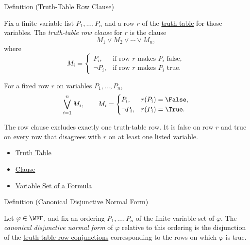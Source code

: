 \begin{definitionbox}{Definition (Truth-Table Row Clause)}
\begin{definition}
\label{def:truth-table-row-clause-propositional-logic}
Fix a finite variable list \(P_1,\ldots,P_n\) and a row \(r\) of the
\hyperref[def:truth-table-propositional-logic]{truth table} for those
variables. The \emph{truth-table row clause} for \(r\) is the clause
\[
M_1\lor M_2\lor\cdots\lor M_n,
\]
where
\[
M_i=
\begin{cases}
P_i, & \text{if row }r\text{ makes }P_i\text{ false},\\
\neg P_i, & \text{if row }r\text{ makes }P_i\text{ true}.
\end{cases}
\]
\end{definition}
\end{definitionbox}

\begin{remark*}
For a fixed row \(r\) on variables \(P_1,\ldots,P_n\),
\[
\bigvee_{i=1}^{n} M_i,
\qquad
M_i=
\begin{cases}
P_i, & r(P_i)=\False,\\
\neg P_i, & r(P_i)=\True.
\end{cases}
\]
\end{remark*}

\begin{remark*}[Interpretation]
The row clause excludes exactly one truth-table row. It is false on row \(r\)
and true on every row that disagrees with \(r\) on at least one listed
variable.
\end{remark*}

\begin{dependencies}
\begin{itemize}
  \item \hyperref[def:truth-table-propositional-logic]{Truth Table}
  \item \hyperref[def:clause-propositional-logic]{Clause}
  \item \hyperref[def:formula-variable-set-propositional-logic]{Variable Set of a Formula}
\end{itemize}
\end{dependencies}

\begin{definitionbox}{Definition (Canonical Disjunctive Normal Form)}
\begin{definition}
\label{def:canonical-disjunctive-normal-form-propositional-logic}
Let \(\varphi\in\WFF\), and fix an ordering \(P_1,\ldots,P_n\) of the finite
variable set of \(\varphi\). The \emph{canonical disjunctive normal form} of
\(\varphi\) relative to this ordering is the disjunction of the
\hyperref[def:truth-table-row-conjunction-propositional-logic]{truth-table row conjunctions}
corresponding to the rows on which \(\varphi\) is true.
\end{definition}
\end{definitionbox}

